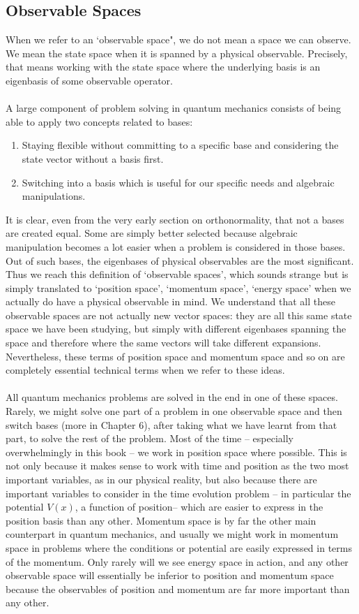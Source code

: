\subsection{Observable Spaces}
When we refer to an `observable space", we do not mean a space we can observe. We mean the state space when it is spanned by a physical observable. Precisely, that means working with the state space where the underlying basis is an eigenbasis of some observable operator.
\\\\
A large component of problem solving in quantum mechanics consists of being able to apply two concepts related to bases:
\begin{enumerate}
    \item Staying flexible without committing to a specific base and considering the state vector without a basis first.
    \item Switching into a basis which is useful for our specific needs and algebraic manipulations. 
\end{enumerate}
It is clear, even from the very early section on orthonormality, that not a bases are created equal. Some are simply better selected because algebraic manipulation becomes a lot easier when a problem is considered in those bases. Out of such bases, the eigenbases of physical observables are the most significant. Thus we reach this definition of `observable spaces', which sounds strange but is simply translated to `position space', `momentum space', `energy space' when we actually do have a physical observable in mind. We understand that all these observable spaces are not actually new vector spaces: they are all this same state space we have been studying, but simply with different eigenbases spanning the space and therefore where the same vectors will take different expansions. Nevertheless, these terms of position space and momentum space and so on are completely essential technical terms when we refer to these ideas.
\\\\
All quantum mechanics problems are solved in the end in one of these spaces. Rarely, we might solve one part of a problem in one observable space and then switch bases (more in Chapter 6), after taking what we have learnt from that part, to solve the rest of the problem. Most of the time -- especially overwhelmingly in this book -- we work in position space  where possible. This is not only because it makes sense to work with time and position as the two most important variables, as in our physical reality, but also because there are important variables to consider in the time evolution problem -- in particular the potential $V(x)$, a function of position-- which are easier to express in the position basis than any other. Momentum space is by far the other main counterpart in quantum mechanics, and usually we might work in momentum space in problems where the conditions or potential are easily expressed in terms of the momentum. Only rarely will we see energy space in action, and any other observable space will essentially be inferior to position and momentum space because the observables of position and momentum are far more important than any other.
